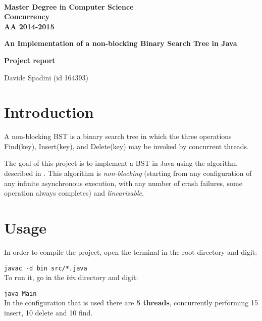 \documentclass[a4paper]{article}
\begin{document}
\begin{centering}
~~~~~~~~~~~~~\\[-20mm]

  {
  \bfseries Master Degree in Computer Science\\[3mm]
  Concurrency\\[3mm]
  AA 2014-2015
  }\\[1mm]


  \vspace{0.5cm}
  {
  \Large \bfseries{An Implementation of a non-blocking Binary Search Tree in Java} \par
  }
  \vspace{0.2cm}
  {
  \small \bfseries{Project report} \par
  }
  \vspace{0.2cm}

  {Davide Spadini (id 164393)}

  \vspace{0.3cm}
\end{centering}



\section{Introduction}\label{introduction}
A non-blocking \ac{BST} is a binary search tree in which the three operations Find(key), Insert(key), and Delete(key) may be invoked by concurrent threads.

The goal of this project is to implement a \ac{BST} in Java using the algorithm described in \cite{algorithm}. 
This algorithm is \emph{non-blocking} (starting from any configuration of any infinite asynchronous execution, with any number of crash failures, some operation always completes) and \emph{linearizable}.

\section{Usage} %
\label{sec:usage}

In order to compile the project, open the terminal in the root directory and digit:

\verb|javac -d bin src/*.java|
\\
\noindent
To run it, go in the \emph{bin} directory and digit:

\verb|java Main|
\\
\noindent
In the configuration that is used there are \textbf{5 threads}, concurrently performing 15 insert, 10 delete and 10 find.
\end{document}
